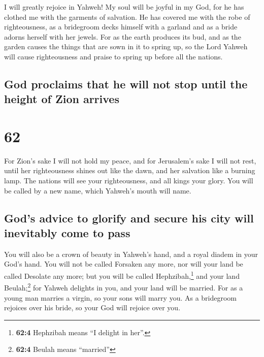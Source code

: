  I will greatly rejoice in Yahweh! My soul will be joyful
in my God, for he has clothed me with the garments of salvation. He has
covered me with the robe of righteousness, as a bridegroom decks himself
with a garland and as a bride adorns herself with her jewels.
 For as the earth produces its bud, and as the garden
causes the things that are sown in it to spring up, so the Lord Yahweh
will cause righteousness and praise to spring up before all the nations.

\hypertarget{god-proclaims-that-he-will-not-stop-until-the-height-of-zion-arrives}{%
\subsection{God proclaims that he will not stop until the height of Zion
arrives}\label{god-proclaims-that-he-will-not-stop-until-the-height-of-zion-arrives}}

\hypertarget{section-61}{%
\section{62}\label{section-61}}

 For Zion's sake I will not hold my peace, and for
Jerusalem's sake I will not rest, until her righteousness shines out
like the dawn, and her salvation like a burning lamp.  The
nations will see your righteousness, and all kings your glory. You will
be called by a new name, which Yahweh's mouth will name.

\hypertarget{gods-advice-to-glorify-and-secure-his-city-will-inevitably-come-to-pass}{%
\subsection{God's advice to glorify and secure his city will inevitably
come to
pass}\label{gods-advice-to-glorify-and-secure-his-city-will-inevitably-come-to-pass}}

 You will also be a crown of beauty in Yahweh's hand, and
a royal diadem in your God's hand.  You will not be called
Forsaken any more, nor will your land be called Desolate any more; but
you will be called Hephzibah,\footnote{\textbf{62:4} Hephzibah means ``I
  delight in her''.} and your land Beulah;\footnote{\textbf{62:4} Beulah
  means ``married''} for Yahweh delights in you, and your land will be
married.  For as a young man marries a virgin, so your
sons will marry you. As a bridegroom rejoices over his bride, so your
God will rejoice over you.

